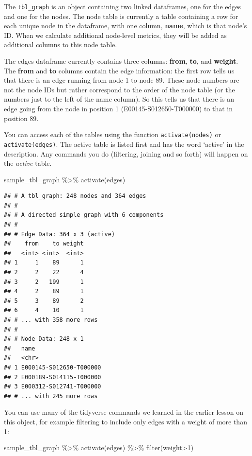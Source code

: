 \documentclass[
]{book}
\newenvironment{Shaded}{\begin{snugshade}}{\end{snugshade}}
\newcommand{\DecValTok}[1]{\textcolor[rgb]{0.00,0.00,0.81}{#1}}
\newcommand{\FunctionTok}[1]{\textcolor[rgb]{0.00,0.00,0.00}{#1}}
\newcommand{\NormalTok}[1]{#1}
\newcommand{\SpecialCharTok}[1]{\textcolor[rgb]{0.00,0.00,0.00}{#1}}
\begin{document}
The \texttt{tbl\_graph} is an object containing two linked dataframes, one for the edges and one for the nodes. The node table is currently a table containing a row for each unique node in the dataframe, with one column, \textbf{name}, which is that node's ID. When we calculate additional node-level metrics, they will be added as additional columns to this node table.

The edges dataframe currently contains three columns: \textbf{from}, \textbf{to}, and \textbf{weight}. The \textbf{from} and \textbf{to} columns contain the edge information: the first row tells us that there is an edge running from node 1 to node 89. These node numbers are not the node IDs but rather correspond to the order of the node table (or the numbers just to the left of the name column). So this tells us that there is an edge going from the node in position 1 (E00145-S012650-T000000) to that in position 89.

You can access each of the tables using the function \texttt{activate(nodes)} or \texttt{activate(edges)}. The active table is listed first and has the word `active' in the description. Any commands you do (filtering, joining and so forth) will happen on the \emph{active} table.

\begin{Shaded}
\begin{Highlighting}[]
\NormalTok{sample\_tbl\_graph }\SpecialCharTok{\%\textgreater{}\%} 
  \FunctionTok{activate}\NormalTok{(edges)}
\end{Highlighting}
\end{Shaded}

\begin{verbatim}
## # A tbl_graph: 248 nodes and 364 edges
## #
## # A directed simple graph with 6 components
## #
## # Edge Data: 364 x 3 (active)
##    from    to weight
##   <int> <int>  <int>
## 1     1    89      1
## 2     2    22      4
## 3     2   199      1
## 4     2    89      1
## 5     3    89      2
## 6     4    10      1
## # ... with 358 more rows
## #
## # Node Data: 248 x 1
##   name                   
##   <chr>                  
## 1 E000145-S012650-T000000
## 2 E000189-S014115-T000000
## 3 E000312-S012741-T000000
## # ... with 245 more rows
\end{verbatim}

You can use many of the tidyverse commands we learned in the earlier lesson on this object, for example filtering to include only edges with a weight of more than 1:

\begin{Shaded}
\begin{Highlighting}[]
\NormalTok{sample\_tbl\_graph }\SpecialCharTok{\%\textgreater{}\%} 
  \FunctionTok{activate}\NormalTok{(edges) }\SpecialCharTok{\%\textgreater{}\%}
  \FunctionTok{filter}\NormalTok{(weight}\SpecialCharTok{\textgreater{}}\DecValTok{1}\NormalTok{)}
\end{Highlighting}
\end{Shaded}
\end{document}
